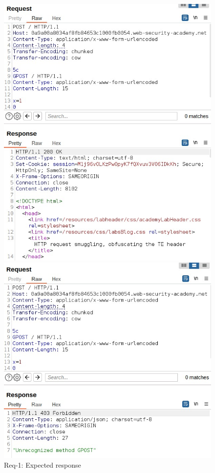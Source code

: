 \documentclass[conference]{IEEEtran}
\begin{document}
\begin{figure}[htbp]
	\centering
	\begin{minipage}[c]{0.45\linewidth}
	  \centering
	  \includegraphics[width=\linewidth]{results/TE.TE_req1_OK_response.jpeg}
	  \caption*{Req-1: Expected response}
	  \label{fig:te.te_req1_ok}
	\end{minipage}
	\hfill
	\begin{minipage}[c]{0.45\linewidth}
	  \centering
	  \includegraphics[width=\linewidth]{results/TE.TE_req2_GPOST_invalid.jpeg}

\end{minipage}
\end{figure}
\end{document}
